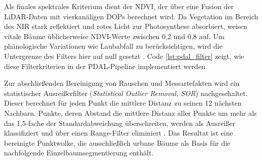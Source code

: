 Als finales spektrales Kriterium dient der NDVI, der über eine Fusion der LiDAR-Daten mit vierkanäligen DOPs berechnet wird. Da Vegetation im Bereich des NIR stark reflektiert und rotes Licht zur Photosynthese absorbiert, weisen vitale Bäume üblicherweise NDVI-Werte zwischen 0,2 und 0,8 auf. Um phänologische Variationen wie Laubabfall zu berücksichtigen, wird die Untergrenze des Filters hier auf null gesetzt \cite{munzingerMappingUrbanForest2022}. Code \ref{lst:pdal_filter} zeigt, wie diese Filterkriterien in der PDAL-Pipeline implementiert werden.

Zur abschließenden Bereinigung von Rauschen und Messartefakten wird ein statistischer Ausreißerfilter (\textit{Statistical Outlier Removal, \ac{SOR}}) nachgeschaltet. Dieser berechnet für jeden Punkt die mittlere Distanz zu seinen 12 nächsten Nachbarn. Punkte, deren Abstand die mittlere Distanz aller Punkte um mehr als das 1,5-fache der Standardabweichung überschreiten, werden als Ausreißer klassifiziert und über einen Range-Filter eliminiert \cite{zhangIndividualTreeSegmentation2024}. Das Resultat ist eine bereinigte Punktwolke, die ausschließlich urbane Bäume als Basis für die nachfolgende Einzelbaumsegmentierung enthält.

